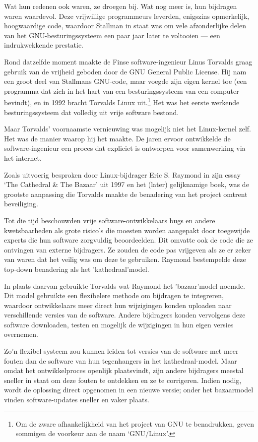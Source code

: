 \documentclass[smalldemyvopaper,11pt,twoside,onecolumn,openright,extrafontsizes,hidelinks]{memoir}
\begin{document}
Wat hun redenen ook waren, ze droegen bij. Wat nog meer is, hun
bijdragen waren waardevol. Deze vrijwillige programmeurs leverden,
enigszins opmerkelijk, hoogwaardige code, waardoor Stallman in staat was
om vele afzonderlijke delen van het GNU-besturingssysteem een paar jaar
later te voltooien --- een indrukwekkende prestatie.

Rond datzelfde moment maakte de Finse software-ingenieur Linus Torvalds
graag gebruik van de vrijheid geboden door de GNU General Public
License. Hij nam een groot deel van Stallmans GNU-code, maar voegde zijn
eigen kernel toe (een programma dat zich in het hart van een
besturingssysteem van een computer bevindt), en in 1992 bracht Torvalds
Linux uit.\footnote{Om de zware afhankelijkheid van het project van GNU
  te benadrukken, geven sommigen de voorkeur aan de naam `GNU/Linux'.}
Het was het eerste werkende besturingssysteem dat volledig uit vrije
software bestond.

Maar Torvalds' voornaamste vernieuwing was mogelijk niet het
Linux-kernel zelf. Het was de manier waarop hij het maakte. De jaren
ervoor ontwikkelde de software-ingenieur een proces dat expliciet is
ontworpen voor samenwerking via het internet.

Zoals uitvoerig besproken door Linux-bijdrager Eric S. Raymond in zijn
essay `The Cathedral \& The Bazaar' uit 1997 en het (later) gelijknamige
boek, was de grootste aanpassing die Torvalds maakte de benadering van
het project omtrent beveiliging.

Tot die tijd beschouwden vrije software-ontwikkelaars bugs en andere
kwetsbaarheden als grote risico's die moesten worden aangepakt door
toegewijde experts die hun software zorgvuldig beoordeelden. Dit omvatte
ook de code die ze ontvingen van externe bijdragers. Ze zouden de code
pas vrijgeven als ze er zeker van waren dat het veilig was om deze te
gebruiken. Raymond bestempelde deze top-down benadering als het
'kathedraal'model.

In plaats daarvan gebruikte Torvalds wat Raymond het 'bazaar'model
noemde. Dit model gebruikte een flexibelere methode om bijdragen te
integreren, waardoor ontwikkelaars meer direct hun wijzigingen konden
uploaden naar verschillende versies van de software. Andere bijdragers
konden vervolgens deze software downloaden, testen en mogelijk de
wijzigingen in hun eigen versies overnemen.

Zo'n flexibel systeem zou kunnen leiden tot versies van de software met
meer fouten dan de software van hun tegenhangers in het
kathedraal-model. Maar omdat het ontwikkelproces openlijk plaatsvindt,
zijn andere bijdragers meestal sneller in staat om deze fouten te
ontdekken en ze te corrigeren. Indien nodig, wordt de oplossing direct
opgenomen in een nieuwe versie; onder het bazaarmodel vinden
software-updates sneller en vaker plaats.
\end{document}

